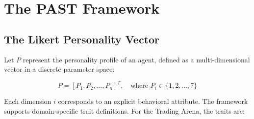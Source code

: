 \documentclass[11pt]{article}
\begin{document}
\section{The PAST Framework}\label{the-past-framework}

\subsection{The Likert Personality Vector}\label{the-likert-personality-vector}

Let \(P\) represent the personality profile of an agent, defined as a multi-dimensional vector in a discrete parameter space:

\[P = [P_1, P_2, \dots, P_n]^T, \quad \text{where } P_i \in \{1, 2, \dots, 7\}\]

Each dimension \(i\) corresponds to an explicit behavioral attribute. The framework supports domain-specific trait definitions. For the Trading Arena, the traits are:
\end{document}
